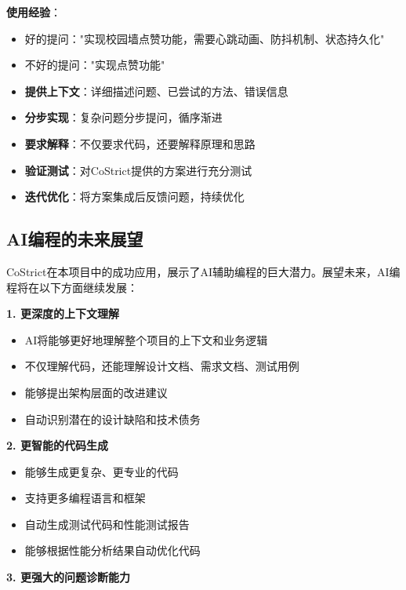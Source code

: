 \documentclass[12pt,a4paper]{article}
\newcommand{\checkmark}{\textcolor{green}{\ding{51}}}
\begin{document}
\begin{itemize}
\textbf{使用经验}：
\begin{itemize}
    \item \textcolor{green}{\checkmark} 好的提问："实现校园墙点赞功能，需要心跳动画、防抖机制、状态持久化"
    \item \textcolor{red}{} 不好的提问："实现点赞功能"
\end{itemize}

\begin{itemize}
    \item \textbf{提供上下文}：详细描述问题、已尝试的方法、错误信息
    \item \textbf{分步实现}：复杂问题分步提问，循序渐进
    \item \textbf{要求解释}：不仅要求代码，还要解释原理和思路
    \item \textbf{验证测试}：对CoStrict提供的方案进行充分测试
    \item \textbf{迭代优化}：将方案集成后反馈问题，持续优化
\end{itemize}

\subsection{AI编程的未来展望}

CoStrict在本项目中的成功应用，展示了AI辅助编程的巨大潜力。展望未来，AI编程将在以下方面继续发展：

\textbf{1. 更深度的上下文理解}

\begin{itemize}
    \item AI将能够更好地理解整个项目的上下文和业务逻辑
    \item 不仅理解代码，还能理解设计文档、需求文档、测试用例
    \item 能够提出架构层面的改进建议
    \item 自动识别潜在的设计缺陷和技术债务
\end{itemize}

\textbf{2. 更智能的代码生成}

\begin{itemize}
    \item 能够生成更复杂、更专业的代码
    \item 支持更多编程语言和框架
    \item 自动生成测试代码和性能测试报告
    \item 能够根据性能分析结果自动优化代码
\end{itemize}

\textbf{3. 更强大的问题诊断能力}


\end{itemize}
\end{document}
